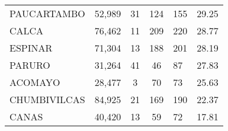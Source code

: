 \begin{tabular}{lrcclr}
	\cellcolor[HTML]{C6E0B4}PAUCARTAMBO                            & 52,989                                                         & 31                                                         & 124                  & 155                                                                 & 29.25                                                                        \\
	\cellcolor[HTML]{C6E0B4}CALCA                                  & 76,462                                                         & 11                                                         & 209                  & 220                                                                 & 28.77                                                                        \\
	\cellcolor[HTML]{C6E0B4}ESPINAR                                & 71,304                                                         & 13                                                         & 188                  & 201                                                                 & 28.19                                                                        \\
	\cellcolor[HTML]{C6E0B4}PARURO                                 & 31,264                                                         & 41                                                         & 46                   & 87                                                                  & 27.83                                                                        \\
	\cellcolor[HTML]{C6E0B4}ACOMAYO                                & 28,477                                                         & 3                                                          & 70                   & 73                                                                  & 25.63                                                                        \\
	\cellcolor[HTML]{C6E0B4}CHUMBIVILCAS                           & 84,925                                                         & 21                                                         & 169                  & 190                                                                 & 22.37                                                                        \\
	\cellcolor[HTML]{C6E0B4}CANAS                                  & 40,420                                                         & 13                                                         & 59                   & 72                                                                  & 17.81                                                                        \\

\end{tabular}
